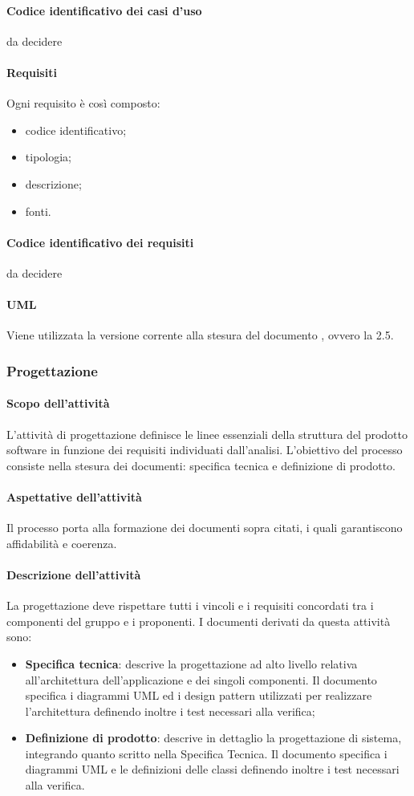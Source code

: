 \paragraph{Codice identificativo dei casi d'uso}
da decidere
 \paragraph{Requisiti}
 Ogni requisito è così composto:
  \begin{itemize}
  \item codice identificativo;
  \item tipologia;
  \item descrizione;
  \item fonti.
 \end{itemize}
 \paragraph{Codice identificativo dei requisiti}
 da decidere
 \paragraph{UML}
 Viene utilizzata la versione corrente alla stesura del documento , ovvero la 2.5.

\subsubsection{Progettazione}
 \paragraph{Scopo dell'attività}
L'attività di progettazione definisce le linee essenziali della struttura del prodotto software in
funzione dei requisiti individuati dall'analisi. L'obiettivo del processo consiste nella stesura dei
documenti: specifica tecnica e definizione di prodotto.
 \paragraph{Aspettative dell'attività}
Il processo porta alla formazione dei documenti sopra citati, i quali garantiscono affidabilità e
coerenza.
 \paragraph{Descrizione dell'attività}
La progettazione deve rispettare tutti i vincoli e i requisiti concordati tra i componenti del gruppo
e i proponenti. I documenti derivati da questa attività sono:
\begin{itemize}
	\item \textbf{Specifica tecnica}: descrive la progettazione ad alto livello relativa all'architettura dell'applicazione
e dei singoli componenti. Il documento specifica i diagrammi UML ed i design
pattern utilizzati per realizzare l'architettura definendo inoltre i test necessari alla verifica;
	\item \textbf{Definizione di prodotto}: descrive in dettaglio la progettazione di sistema, integrando
quanto scritto nella Specifica Tecnica. Il documento specifica i diagrammi UML e le
definizioni delle classi definendo inoltre i test necessari alla verifica.
\end{itemize}
